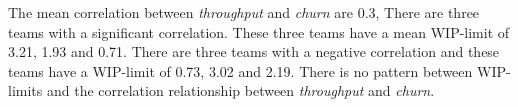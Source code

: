 \documentclass[UKenglish]{ifimaster}  %
\begin{document}
The mean correlation between \textit{throughput} and \textit{churn} are 0.3, There are three teams with a significant correlation. These three teams have a mean  WIP-limit of 3.21, 1.93 and 0.71. There are three teams with a negative correlation and these teams have a WIP-limit of 0.73, 3.02 and 2.19. There is no pattern between WIP-limits and the correlation relationship between \textit{throughput} and \textit{churn}. 





\end{document}
